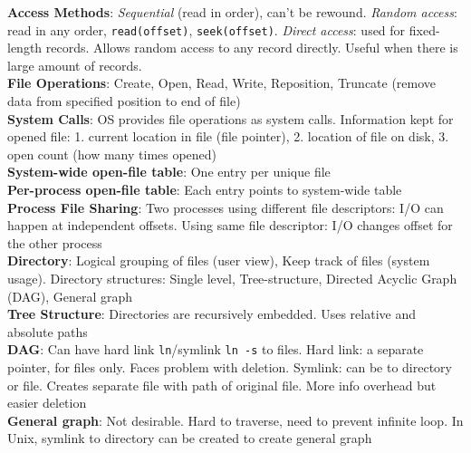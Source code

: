 \documentclass{article}
\begin{document}
{\begin{multicols*}{3}
\textbf{Access Methods}: \textit{Sequential} (read in order), can't be rewound. \textit{Random access}: read in any order, \texttt{read(offset)}, \texttt{seek(offset)}. \textit{Direct access}: used for fixed-length records. Allows random access to any record directly. Useful when there is large amount of records.\\
\textbf{File Operations}: Create, Open, Read, Write, Reposition, Truncate (remove data from specified position to end of file) \\
\textbf{System Calls}: OS provides file operations as system calls. Information kept for opened file: 1. current location in file (file pointer), 2. location of file on disk, 3. open count (how many times opened)\\
\textbf{System-wide open-file table}: One entry per unique file\\
\textbf{Per-process open-file table}: Each entry points to system-wide table\\
\textbf{Process File Sharing}: Two processes using different file descriptors: I/O can happen at independent offsets. Using same file descriptor: I/O changes offset for the other process \\ 
\textbf{Directory}: Logical grouping of files (user view), Keep track of files (system usage). Directory structures: Single level, Tree-structure, Directed Acyclic Graph (DAG), General graph \\
\textbf{Tree Structure}: Directories are recursively embedded. Uses relative and absolute paths\\
\textbf{DAG}: Can have hard link \texttt{ln}/symlink \texttt{ln -s} to files. Hard link: a separate pointer, for files only. Faces problem with deletion. Symlink: can be to directory or file. Creates separate file with path of original file. More info overhead but easier deletion \\
\textbf{General graph}: Not desirable. Hard to traverse, need to prevent infinite loop. In Unix, symlink to directory can be created to create general graph

\end{multicols*}}
\end{document}
